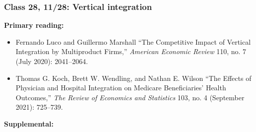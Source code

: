 \documentclass[11pt,]{article}
\providecommand{\tightlist}{%
  \setlength{\itemsep}{0pt}\setlength{\parskip}{0pt}}
\begin{document}
\hypertarget{class-28-1128-vertical-integration}{%
\subsubsection{Class 28, 11/28: Vertical
integration}\label{class-28-1128-vertical-integration}}

\textbf{Primary reading:}

\begin{itemize}
\tightlist
\item
  Fernando Luco and Guillermo Marshall {``The {Competitive} {Impact} of
  {Vertical} {Integration} by {Multiproduct} {Firms},''} \emph{American
  Economic Review} 110, no. 7 (July 2020): 2041--2064.
\item
  Thomas G. Koch, Brett W. Wendling, and Nathan E. Wilson {``The
  {Effects} of {Physician} and {Hospital} {Integration} on {Medicare}
  {Beneficiaries}' {Health} {Outcomes},''} \emph{The Review of Economics
  and Statistics} 103, no. 4 (September 2021): 725--739.
\end{itemize}

\textbf{Supplemental:}
\end{document}
